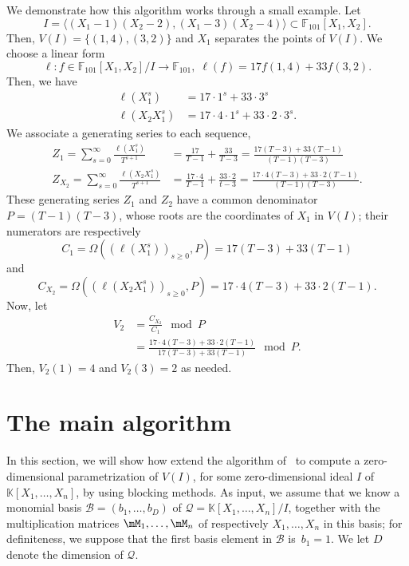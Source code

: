\documentclass[12pt]{article}
\newcommand{\basis}{\mathscr{B}}
\newcommand{\minpoly}{P}
\newcommand{\residueI}{\mathscr{Q}}
\def\F {\ensuremath{\mathbb{F}}}
\def\K{\mathbb{K}}
\def\K {\ensuremath{\mathbb{K}}}
\begin{document}
We demonstrate how this algorithm works through a small example. Let 
$$I = \langle (X_1-1)(X_2-2),(X_1-3)(X_2-4)\rangle \subset
\F_{101}[X_1,X_2].$$ Then, $V(I) = \{ (1,4),(3,2) \}$ and $X_1$ separates the
points of $V(I)$. We choose a  linear form 
$$\ell: f \in \F_{101}[X_1,X_2]/I \to \F_{101},\;\ell(f) = 17 f(1,4) + 33 f(3,2).$$
Then, we have
\begin{align*}
\ell(X_1^s) &= 17 \cdot 1^s + 33 \cdot 3^s\\
\ell(X_2X_1^s) &= 17 \cdot 4 \cdot 1^s + 33 \cdot 2 \cdot 3^s.
\end{align*} 
We associate a generating series to each sequence,
\begin{align*}
Z_1 = \sum_{s = 0}^{\infty} \frac{\ell(X^s_1)}{T^{s+1}}
&= \frac{17}{T-1} + \frac{33}{T-3}
= \frac{17(T-3)+33(T-1)}{(T-1)(T-3)} \\
Z_{X_2} = \sum_{s=0}^{\infty} \frac{\ell(X_2X_1^s)}{T^{s+1} }
&= \frac{17\cdot 4}{T-1} + \frac{33 \cdot 2}{t-3}
= \frac{17\cdot 4 (T-3) + 33\cdot 2(T-1)}{(T-1)(T-3)}.
\end{align*}
These generating series $Z_1$ and $Z_2$ have a common denominator $\minpoly = (T-1)(T-3)$,
whose roots are the coordinates of $X_1$ in $V(I)$;
their numerators are respectively
$$C_{1} = \Omega((\ell(X^s_1))_{s\ge 0},\minpoly) = 17 (T-3) + 33(T-1)$$
and
$$C_{X_2} = \Omega((\ell(X_2X^s_1))_{s\ge 0},\minpoly) = 17\cdot 4 (T-3) + 33\cdot 2(T-1).$$
Now, let
\begin{align*}
V_2 
&=\frac{C_{X_2}}{C_1} \mod \minpoly\\
&=\frac{17\cdot 4 (T-3) + 33\cdot 2(T-1)}{17(T-3)+33(T-1)} \mod \minpoly.
\end{align*}
Then, $ V_2(1) = 4$ and $V_2(3) = 2$ as needed.


\section{The main algorithm}

In this section, we will show how extend the algorithm
of~\cite{BoSaSc03} to compute a zero-dimensional parametrization of
$V(I)$, for some zero-dimensional ideal $I$ of $\K[X_1,\dots,X_n]$, by
using blocking methods. As input, we assume that we know a monomial
basis $\basis=(b_1,\dots,b_D)$ of $\residueI=\K[X_1,\dots,X_n]/I$, together with the
multiplication matrices $\mM_1,\dots,\mM_n$ of respectively
$X_1,\dots,X_n$ in this basis; for definiteness, we suppose that the
first basis element in $\basis$ is~$b_1=1$. We let $D$ denote the 
dimension of $\residueI$.
\end{document}
